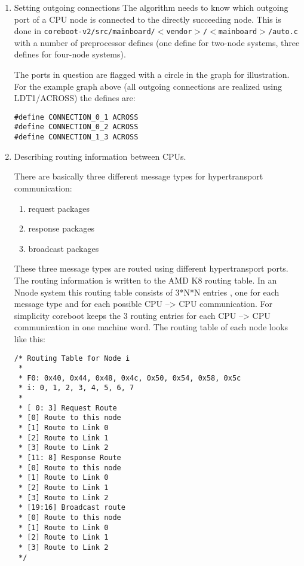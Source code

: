 \documentclass[titlepage,12pt]{article}
\begin{document}
\begin{enumerate}
\item Setting outgoing connections
The algorithm needs to know which outgoing port of a CPU node is
connected to the directly succeeding node. This is done in
\texttt{coreboot-v2/src/mainboard/$<$vendor$>$/$<$mainboard$>$/auto.c}
with a number of preprocessor defines (one define for two-node systems,
three defines for four-node systems).

The ports in question are flagged with a circle in the graph for
illustration. For the example graph above (all outgoing connections are
realized using LDT1/ACROSS) the defines are:

\begin{verbatim}
#define CONNECTION_0_1 ACROSS
#define CONNECTION_0_2 ACROSS
#define CONNECTION_1_3 ACROSS
\end{verbatim}

\item Describing routing information between CPUs.

There are basically three different message types for hypertransport
communication:
\begin{enumerate}
\item request packages
\item response packages
\item broadcast packages
\end{enumerate}

These three message types are routed using different hypertransport
ports. The routing information is written to the AMD K8 routing table.
In an Nnode system this routing table consists of 3*N*N entries , one
for each message type and for each possible CPU --> CPU communication. For
simplicity coreboot keeps the 3 routing entries for each CPU --> CPU
communication in one machine word.  The routing table of each node looks
like this:

\begin{verbatim}
/* Routing Table for Node i
 *
 * F0: 0x40, 0x44, 0x48, 0x4c, 0x50, 0x54, 0x58, 0x5c
 * i: 0, 1, 2, 3, 4, 5, 6, 7
 *
 * [ 0: 3] Request Route
 * [0] Route to this node
 * [1] Route to Link 0
 * [2] Route to Link 1
 * [3] Route to Link 2
 * [11: 8] Response Route
 * [0] Route to this node
 * [1] Route to Link 0
 * [2] Route to Link 1
 * [3] Route to Link 2
 * [19:16] Broadcast route
 * [0] Route to this node
 * [1] Route to Link 0
 * [2] Route to Link 1
 * [3] Route to Link 2
 */
\end{verbatim}


\end{enumerate}
\end{document}
